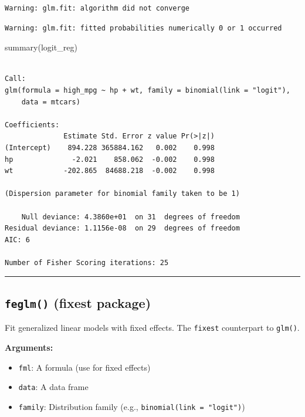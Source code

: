 \documentclass[
  letterpaper,
  DIV=11,
  numbers=noendperiod]{scrreprt}
\newenvironment{Shaded}{\begin{snugshade}}{\end{snugshade}}
\newcommand{\FunctionTok}[1]{\textcolor[rgb]{0.28,0.35,0.67}{#1}}
\newcommand{\NormalTok}[1]{\textcolor[rgb]{0.00,0.23,0.31}{#1}}
\providecommand{\tightlist}{%
  \setlength{\itemsep}{0pt}\setlength{\parskip}{0pt}}
\begin{document}
\begin{verbatim}
Warning: glm.fit: algorithm did not converge
\end{verbatim}

\begin{verbatim}
Warning: glm.fit: fitted probabilities numerically 0 or 1 occurred
\end{verbatim}

\begin{Shaded}
\begin{Highlighting}[]
\FunctionTok{summary}\NormalTok{(logit\_reg)}
\end{Highlighting}
\end{Shaded}

\begin{verbatim}

Call:
glm(formula = high_mpg ~ hp + wt, family = binomial(link = "logit"), 
    data = mtcars)

Coefficients:
              Estimate Std. Error z value Pr(>|z|)
(Intercept)    894.228 365884.162   0.002    0.998
hp              -2.021    858.062  -0.002    0.998
wt            -202.865  84688.218  -0.002    0.998

(Dispersion parameter for binomial family taken to be 1)

    Null deviance: 4.3860e+01  on 31  degrees of freedom
Residual deviance: 1.1156e-08  on 29  degrees of freedom
AIC: 6

Number of Fisher Scoring iterations: 25
\end{verbatim}

\begin{center}\rule{0.5\linewidth}{0.5pt}\end{center}

\subsection{\texorpdfstring{\texttt{feglm()} (fixest
package)}{feglm() (fixest package)}}\label{feglm-fixest-package}

Fit generalized linear models with fixed effects. The \texttt{fixest}
counterpart to \texttt{glm()}.

\textbf{Arguments:}

\begin{itemize}
\tightlist
\item
  \texttt{fml}: A formula (use \texttt{\textbar{}} for fixed effects)
\item
  \texttt{data}: A data frame
\item
  \texttt{family}: Distribution family (e.g.,
  \texttt{binomial(link\ =\ "logit")})
\end{itemize}
\end{document}
